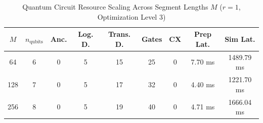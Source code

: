 \begin{table}[t]
\centering
\caption{Quantum Circuit Resource Scaling Across Segment Lengths $M$ ($r=1$, Optimization Level 3)}
\label{tab:quantum_resources}
\begin{tabular}{ccccccccc}
\hline
\textbf{$M$} & \textbf{$n_{\text{qubits}}$} & \textbf{Anc.} & \textbf{Log. D.} & \textbf{Trans. D.} & \textbf{Gates} & \textbf{CX} & \textbf{Prep Lat.} & \textbf{Sim Lat.} \\
\hline
64 & 6 & 0 & 5 & 15 & 25 & 0 & 7.70 ms & 1489.79 ms \\
128 & 7 & 0 & 5 & 17 & 32 & 0 & 4.40 ms & 1221.70 ms \\
256 & 8 & 0 & 5 & 19 & 40 & 0 & 4.71 ms & 1666.04 ms \\
\hline
\end{tabular}
\end{table}
